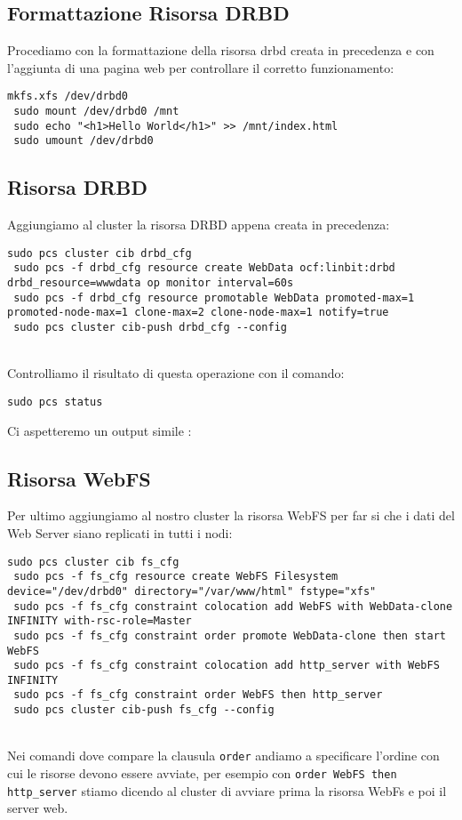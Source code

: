 \subsection{Formattazione Risorsa DRBD}

Procediamo con la formattazione della risorsa drbd creata in precedenza e con l'aggiunta di una pagina web per controllare il corretto funzionamento:

\begin{lstlisting}[style=cmd]
 mkfs.xfs /dev/drbd0
 sudo mount /dev/drbd0 /mnt
 sudo echo "<h1>Hello World</h1>" >> /mnt/index.html
 sudo umount /dev/drbd0
\end{lstlisting}

\subsection{Risorsa DRBD}

Aggiungiamo al cluster la risorsa DRBD appena creata in precedenza:

\begin{lstlisting}[style=cmd]
 sudo pcs cluster cib drbd_cfg
 sudo pcs -f drbd_cfg resource create WebData ocf:linbit:drbd drbd_resource=wwwdata op monitor interval=60s
 sudo pcs -f drbd_cfg resource promotable WebData promoted-max=1 promoted-node-max=1 clone-max=2 clone-node-max=1 notify=true
 sudo pcs cluster cib-push drbd_cfg --config
\end{lstlisting}
\ \\
Controlliamo il risultato di questa operazione con il comando:

\begin{lstlisting}[style=cmd]
 sudo pcs status
\end{lstlisting}

Ci aspetteremo un output simile :


\subsection{Risorsa WebFS}

Per ultimo aggiungiamo al nostro cluster la risorsa WebFS per far si che i dati del Web Server siano replicati in tutti i nodi:

\begin{lstlisting}[style=cmd]
 sudo pcs cluster cib fs_cfg
 sudo pcs -f fs_cfg resource create WebFS Filesystem device="/dev/drbd0" directory="/var/www/html" fstype="xfs"
 sudo pcs -f fs_cfg constraint colocation add WebFS with WebData-clone INFINITY with-rsc-role=Master
 sudo pcs -f fs_cfg constraint order promote WebData-clone then start WebFS
 sudo pcs -f fs_cfg constraint colocation add http_server with WebFS INFINITY
 sudo pcs -f fs_cfg constraint order WebFS then http_server
 sudo pcs cluster cib-push fs_cfg --config
\end{lstlisting}
\ \\
Nei comandi dove compare la clausula \lstinline[style=cmd]|order| andiamo a specificare l'ordine con cui le risorse devono essere avviate, per esempio con \lstinline[style=cmd]|order WebFS then http_server| stiamo dicendo al cluster di avviare prima la risorsa WebFs e poi il server web.

